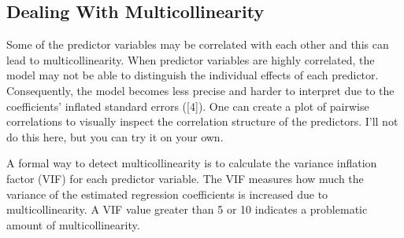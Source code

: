 \documentclass[
  letterpaper,
]{book}
\begin{document}
\subsection{Dealing With Multicollinearity}\label{sec-multicollinearity}

Some of the predictor variables may be correlated with each other and
this can lead to multicollinearity. When predictor variables are highly
correlated, the model may not be able to distinguish the individual
effects of each predictor. Consequently, the model becomes less precise
and harder to interpret due to the coefficients' inflated standard
errors ({[}4{]}). One can create a plot of pairwise correlations to
visually inspect the correlation structure of the predictors. I'll not
do this here, but you can try it on your own.

A formal way to detect multicollinearity is to calculate the variance
inflation factor (VIF) for each predictor variable. The VIF measures how
much the variance of the estimated regression coefficients is increased
due to multicollinearity. A VIF value greater than 5 or 10 indicates a
problematic amount of multicollinearity.
\end{document}

